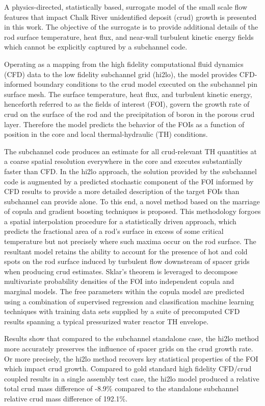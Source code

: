
\utabstract
{}%
\indent
A physics-directed, statistically based,
surrogate model of the small scale flow features that impact Chalk River unidentified deposit (crud) growth is presented in this work. 
The objective of the surrogate is to provide additional details of the rod surface temperature, heat
flux, and near-wall turbulent kinetic energy fields which cannot be explicitly captured by a subchannel code. 

Operating as a mapping from the high fidelity computational fluid dynamics (CFD) data to the low fidelity subchannel grid (hi2lo), the model provides CFD-informed boundary conditions to the crud model executed on the subchannel pin surface mesh. The surface temperature, heat
flux, and turbulent kinetic energy, henceforth referred to as the fields of interest (FOI),
govern the growth rate of crud on the surface of the rod and the
precipitation of boron in the porous crud layer. Therefore the model predicts the behavior of the
FOIs as a function of position in the core and local thermal-hydraulic (TH) conditions.

The subchannel code produces an estimate for all crud-relevant TH quantities at a coarse spatial resolution everywhere in
the core and executes substantially faster than CFD.  In the hi2lo approach, the solution provided by the subchannel code is augmented by a predicted stochastic
component of the FOI informed by CFD results to provide a more detailed description of the target
FOIs than subchannel can provide alone.  To this end, a novel method based on the marriage of copula and
gradient boosting techniques is proposed. This methodology forgoes a spatial interpolation procedure
for a statistically driven approach, which predicts the fractional area of a rod’s surface in excess of some
critical temperature but not precisely where such maxima occur on the rod surface.
The resultant model retains the ability to account for the presence
of hot and cold spots on the rod surface induced by turbulent flow downstream of spacer grids when
producing crud estimates. Sklar’s theorem is leveraged to decompose multivariate probability densities
of the FOI into independent copula and marginal models. The free parameters within the copula model
are predicted using a combination of supervised regression and classification machine learning techniques
with training data sets supplied by a suite of precomputed CFD results spanning a typical pressurized water reactor TH
envelope.

Results show that compared to the subchannel standalone case, the hi2lo method more accurately preserves the influence of spacer grids on the crud growth rate.  Or more precisely, the hi2lo method recovers key statistical properties of the FOI which impact crud growth.  Compared to gold standard high fidelity CFD/crud coupled results in a single assembly test case, the hi2lo model produced a relative total crud mass difference of -8.9\% compared to the standalone subchannel relative crud mass difference of 192.1\%.
